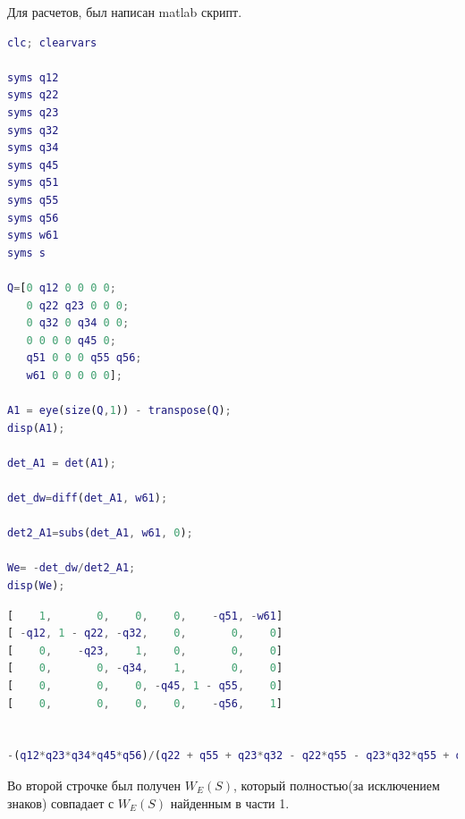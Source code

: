 Для расчетов, был написан matlab скрипт.
\begin{lstlisting}[language={matlab}, caption={Matlab скрипт}, basicstyle=\ttfamily]
clc; clearvars

syms q12
syms q22
syms q23
syms q32
syms q34
syms q45
syms q51
syms q55
syms q56
syms w61
syms s

Q=[0 q12 0 0 0 0;
   0 q22 q23 0 0 0;
   0 q32 0 q34 0 0;
   0 0 0 0 q45 0;
   q51 0 0 0 q55 q56;
   w61 0 0 0 0 0];

A1 = eye(size(Q,1)) - transpose(Q);
disp(A1);

det_A1 = det(A1);

det_dw=diff(det_A1, w61);

det2_A1=subs(det_A1, w61, 0);

We= -det_dw/det2_A1;
disp(We);
\end{lstlisting}
\begin{lstlisting}[language={matlab}, caption={Результат}, basicstyle=\ttfamily]
[    1,       0,    0,    0,    -q51, -w61]
[ -q12, 1 - q22, -q32,    0,       0,    0]
[    0,    -q23,    1,    0,       0,    0]
[    0,       0, -q34,    1,       0,    0]
[    0,       0,    0, -q45, 1 - q55,    0]
[    0,       0,    0,    0,    -q56,    1]
 
 
-(q12*q23*q34*q45*q56)/(q22 + q55 + q23*q32 - q22*q55 - q23*q32*q55 + q12*q23*q34*q45*q51 - 1)
\end{lstlisting}
Во второй строчке был получен $W_E(S)$, который полностью(за исключением знаков) совпадает с $W_E(S)$ найденным в части 1.


